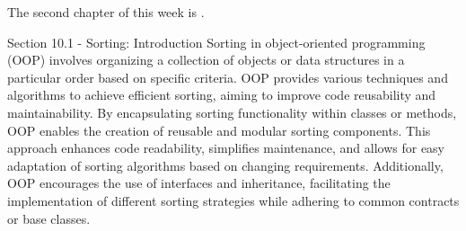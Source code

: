 The second chapter of this week is .

\begin{notes}{Section 10.1 - Sorting: Introduction}
    Sorting in object-oriented programming (OOP) involves organizing a collection of objects or data structures in a particular order based on specific criteria. OOP provides various techniques and algorithms to achieve efficient sorting, aiming to improve code reusability and maintainability. By encapsulating sorting functionality within classes or methods, OOP enables the creation of reusable and modular sorting components. This approach enhances code readability, simplifies 
maintenance, and allows for easy adaptation of sorting algorithms based on changing requirements. Additionally, OOP encourages the use of interfaces and inheritance, facilitating the implementation of different sorting strategies while adhering to common contracts or base classes.
\end{notes}

